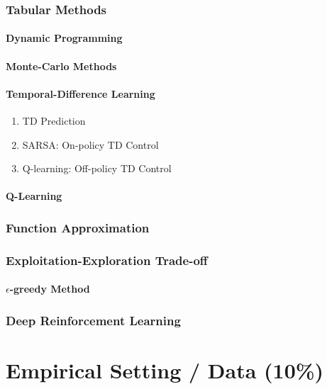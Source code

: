 \documentclass[a4paper, twoside, 12pt]{article}
\begin{document}
\subsubsection{Tabular Methods}
\label{sec:orge9ae482}
\paragraph{Dynamic Programming}
\label{sec:org92189db}
\paragraph{Monte-Carlo Methods}
\label{sec:orga410571}
\paragraph{Temporal-Difference Learning}
\label{sec:org5c9468b}
\begin{enumerate}
\item TD Prediction
\label{sec:org5abb7f1}
\item SARSA: On-policy TD Control
\label{sec:org969082d}
\item Q-learning: Off-policy TD Control
\label{sec:org5770b43}
\end{enumerate}
\paragraph{Q-Learning}
\label{sec:org80c5094}
\subsubsection{Function Approximation}
\label{sec:orge30b02d}
\subsubsection{Exploitation-Exploration Trade-off}
\label{sec:orgeda100e}
\paragraph{\(\epsilon\)-greedy Method}
\label{sec:org24dc8d2}
\subsubsection{Deep Reinforcement Learning}
\label{sec:org87bf818}
\section{Empirical Setting / Data (10\%)}
\label{sec:orgbcc5603}
\end{document}
